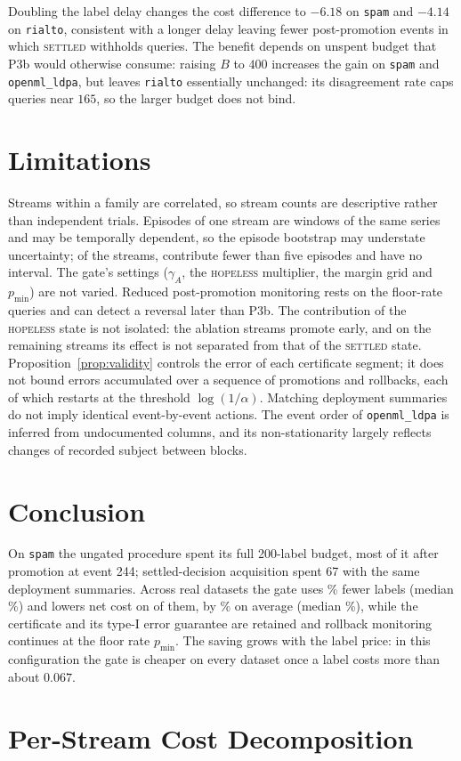 \documentclass[10pt]{article}
\begin{document}
Doubling the label delay changes the cost difference to $-6.18$ on \texttt{spam} and $-4.14$ on
\texttt{rialto}, consistent with a longer delay leaving fewer post-promotion events in which
\textsc{settled} withholds queries. The benefit depends on unspent budget that \textsf{P3b} would
otherwise consume: raising $B$ to $400$ increases the gain on \texttt{spam} and
\texttt{openml\_ldpa}, but leaves \texttt{rialto} essentially unchanged: its disagreement rate caps
queries near $165$, so the larger budget does not bind.

\section{Limitations}\label{sec:limits}
Streams within a family are correlated, so stream counts are descriptive rather than independent
trials. Episodes of one stream are windows of the same series and may be temporally dependent, so
the episode bootstrap may understate uncertainty; of the streams, \NLowPower{} contribute fewer
than five episodes and have no interval. The gate's settings ($\gamma_A$, the \textsc{hopeless} multiplier, the margin
grid and $p_{\min}$) are not varied. Reduced post-promotion monitoring rests on the floor-rate queries and
can detect a reversal later than \textsf{P3b}. The contribution of the \textsc{hopeless} state is
not isolated: the ablation streams promote early, and on the remaining streams its effect is not
separated from that of the \textsc{settled} state. Proposition~\ref{prop:validity} controls the error of each certificate segment; it
does not bound errors accumulated over a sequence of promotions and rollbacks, each of which
restarts at the threshold $\log(1/\alpha)$. Matching deployment summaries do not imply identical
event-by-event actions. The event order of \texttt{openml\_ldpa} is inferred from undocumented
columns, and its non-stationarity largely reflects changes of recorded subject between blocks.

\section{Conclusion}
On \texttt{spam} the ungated procedure spent its full 200-label budget, most of it after
promotion at event 244; settled-decision acquisition spent 67 with the same deployment
summaries. Across \NStreams{} real datasets the
gate uses \MeanSaving\% fewer labels (median \MedSaving\%) and lowers net cost on \NCheaper{} of
them, by \MeanCostChange\% on average (median \MedCostChange\%), while the certificate and its type-I
error guarantee are retained and rollback monitoring continues at the floor rate $p_{\min}$. The
saving grows with the label price: in this configuration the gate is cheaper on every dataset once
a label costs more than about $0.067$.




\clearpage
\appendix
\section{Per-Stream Cost Decomposition}\label{app:streams}
{\footnotesize\setlength{\tabcolsep}{3pt}}
\end{document}
